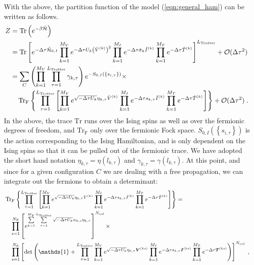 With the above, the partition function of the model (\ref{eqn:general_ham}) can be written as follows.
\begin{align}\label{eqn:partition_1}
Z &= \mathop{\mathrm{Tr}}{\left(e^{-\beta \hat{\mathcal{H}} }\right)}\nonumber\\
  &=   \mathop{\mathrm{Tr}}{  \left[ e^{-\Delta \tau \hat{\mathcal{H}}_{0,I}}  
    \prod_{k=1}^{M_V}   e^{ - \Delta \tau  U_k \left(  \hat{V}^{(k)} \right)^2}   \prod_{k=1}^{M_I}   e^{  -\Delta \tau  \hat{\sigma}_{k}  \hat{I}^{(k)}} 
     \prod_{k=1}^{M_T}   e^{-\Delta \tau \hat{T}^{(k)}}  
   \right]^{L_{\text{Trotter}}}}  + \mathcal{O}(\Delta\tau^{2})\nonumber \\
   &=
   \sum_{C} \left( \prod_{k=1}^{M_V} \prod_{\tau=1}^{L_{\mathrm{Trotter}}} \gamma_{k,\tau} \right) e^{-S_{0,I} \left( \left\{ s_{i,\tau} \right\}  \right) }\times \nonumber\\
   &\quad
    \mathop{\mathrm{Tr}_{\mathrm{F}}}{ \left\{  \prod_{\tau=1}^{L_{\mathrm{Trotter}}} \left[  
    \prod_{k=1}^{M_V}   e^{  \sqrt{ -\Delta \tau  U_k} \eta_{k,\tau} \hat{V}^{(k)} }   \prod_{k=1}^{M_I}   e^{  -\Delta \tau s_{k,\tau}  \hat{I}^{(k)}}  
      \prod_{k=1}^{M_T}   e^{-\Delta \tau \hat{T}^{(k)}}    \right]\right\} }+ \mathcal{O}(\Delta\tau^{2})\;.
\end{align}
In the above,  the trace $\mathrm{Tr} $  runs over the Ising spins as well as over the fermionic degrees of freedom, and $ \mathrm{Tr}_{\mathrm{F}}  $ only over the  fermionic Fock space. 
$S_{0,I} \left( \left\{ s_{i,\tau} \right\}  \right)  $ is the action  corresponding to the Ising Hamiltonian,  and is only dependent on the Ising spins so that  it can be pulled out of the fermionic trace.  We have adopted the short hand notation $\eta_{k,\tau}  = \eta(l_{k,\tau})$   and $\gamma_{k,\tau}  = \gamma(l_{k,\tau})$.
At this point,  and  since for a given configuration $C$  we are dealing with a free propagation, we can integrate out the fermions to obtain a determinant: 
\begin{align}
 &\Trf{ \left\{  \prod_{\tau=1}^{L_{\mathrm{Trotter}}} \left[    
    \prod_{k=1}^{M_V}   e^{  \sqrt{ - \Delta \tau  U_k} \eta_{k,\tau} \hat{V}^{(k)} }   \prod_{k=1}^{M_I}   e^{  -\Delta \tau s_{k,\tau}  \hat{I}^{(k)}} 
    \prod_{k=1}^{M_T}   e^{-\Delta \tau \hat{T}^{(k)}}   \right] \right\}} = \nonumber\\
& \quad\prod\limits_{s=1}^{N_{\mathrm{fl}}} \left[  e^{\sum\limits_{k=1}^{M_V} \sum\limits_{\tau = 1}^{L_{\mathrm{Trotter}}}\sqrt{-\Delta \tau U_k}  \alpha_{k,s} \eta_{k,\tau} }
   \right]^{N_{\mathrm{col}}}\times
\nonumber\\
&\quad   \prod\limits_{s=1}^{N_{\mathrm{fl}}} 
   \left[
    \det\left(  \mathds{1} + 
     \prod_{\tau=1}^{L_{\mathrm{Trotter}}}   
    \prod_{k=1}^{M_V}   e^{  \sqrt{ -\Delta \tau  U_k} \eta_{k,\tau} {\bm V}^{(ks)} }   \prod_{k=1}^{M_I}   e^{  -\Delta \tau s_{k,\tau}  {\bm I}^{(ks)}}  
      \prod_{k=1}^{M_T}   e^{-\Delta \tau \bm{T}^{(ks)}}   \right) \right]^{N_{\mathrm{col}}}\;,
\end{align}
